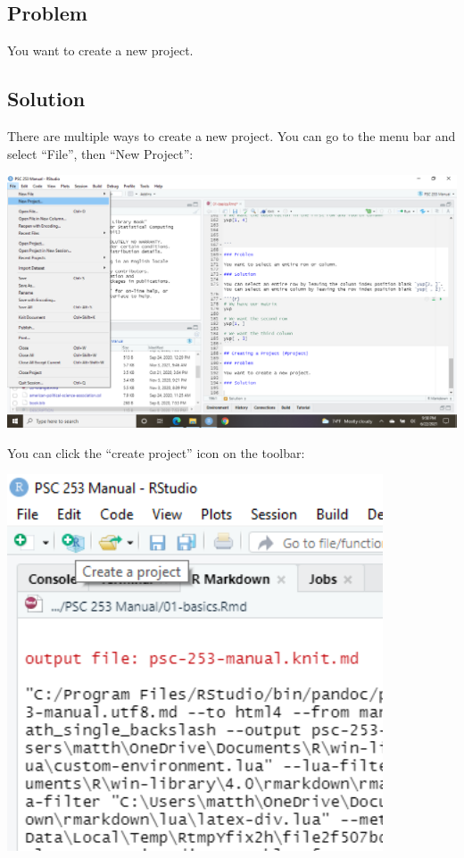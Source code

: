 \documentclass[
]{book}
\begin{document}
\hypertarget{problem-5}{%
\subsection{Problem}\label{problem-5}}

You want to create a new project.

\hypertarget{solution-5}{%
\subsection{Solution}\label{solution-5}}

There are multiple ways to create a new project. You can go to the menu bar and select ``File'', then ``New Project'':

\includegraphics[width=18.97in]{images/projectfile}

You can click the ``create project'' icon on the toolbar:

\includegraphics[width=4.39in]{images/projectbar}
\end{document}
